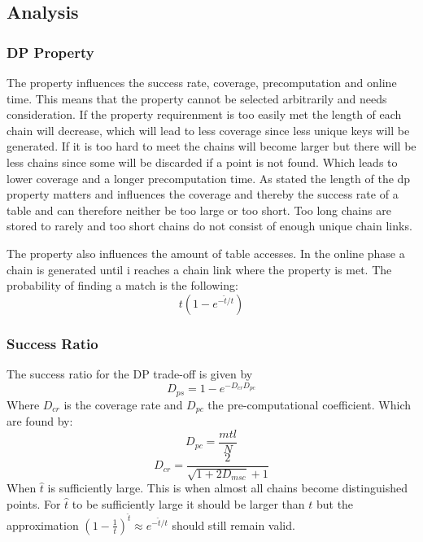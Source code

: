 \subsection{Analysis}
\subsubsection{DP Property}
The property influences the success rate, coverage, precomputation and online time. This means that the property cannot be selected arbitrarily and needs consideration. If the property requirenment is too easily met the length of each chain will decrease, which will lead to less coverage since less unique keys will be generated. If it is too hard to meet the chains will become larger but there will be less chains since some will be discarded if a point is not found. Which leads to lower coverage and a longer precomputation time. As stated the length of the dp property matters and influences the coverage and thereby the success rate of a table and can therefore neither be too large or too short. Too long chains are stored to rarely and too short chains do not consist of enough unique chain links.

The property also influences the amount of table accesses. In the online phase a chain is generated until i reaches a chain link where the property is met. The probability of finding a match is the following:
\begin{equation}
t(1-e^{-\hat{t}/t})
\end{equation}

\subsubsection{Success Ratio}
The success ratio for the DP trade-off is given by
\begin{equation}
  D_{ps}=1-e^{-D_{cr}D_{pc}}
\end{equation}
Where $D_{cr}$ is the coverage rate and $D_{pc}$ the pre-computational coefficient. Which are found by:
\begin{equation}
  D_{pc}=\frac{mtl}{N}
\end{equation}
\begin{equation}
  D_{cr}=\frac{2}{\sqrt{1+2D_{msc}}+1}
\end{equation}
When $\hat{t}$ is sufficiently large. This is when almost all chains become distinguished points. For $\hat{t}$ to be sufficiently large it should be larger than $t$ but the approximation $(1-\frac{1}{t})^{\hat{t}}\approx e^{-\hat{t}/t}$ should still remain valid.
